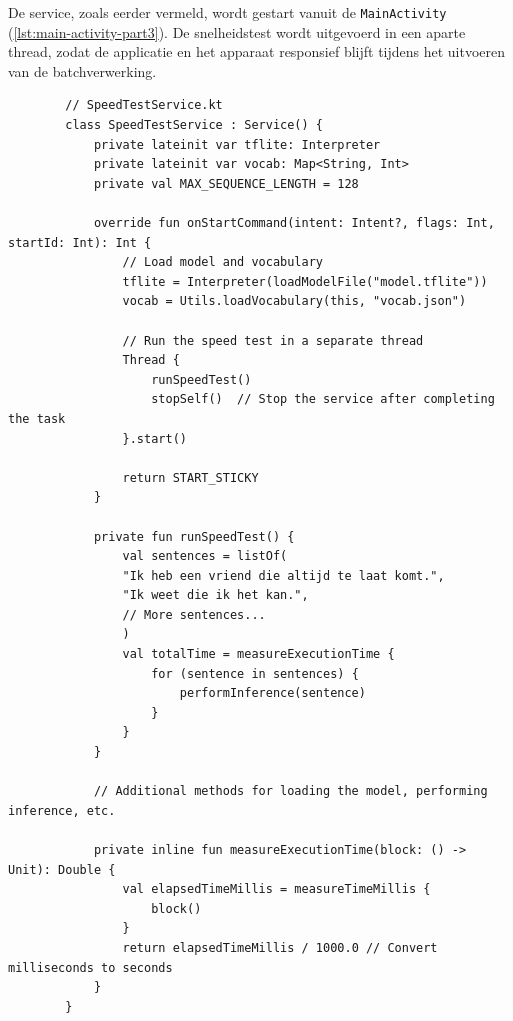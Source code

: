 De service, zoals eerder vermeld, wordt gestart vanuit de \texttt{MainActivity} (\ref{lst:main-activity-part3}). De snelheidstest wordt uitgevoerd in een aparte thread, zodat de applicatie en het apparaat responsief blijft tijdens het uitvoeren van de batchverwerking.

\begin{listing}
    \begin{verbatim}
        // SpeedTestService.kt
        class SpeedTestService : Service() {
            private lateinit var tflite: Interpreter
            private lateinit var vocab: Map<String, Int>
            private val MAX_SEQUENCE_LENGTH = 128
            
            override fun onStartCommand(intent: Intent?, flags: Int, startId: Int): Int {
                // Load model and vocabulary
                tflite = Interpreter(loadModelFile("model.tflite"))
                vocab = Utils.loadVocabulary(this, "vocab.json")
                
                // Run the speed test in a separate thread
                Thread {
                    runSpeedTest()
                    stopSelf()  // Stop the service after completing the task
                }.start()
                
                return START_STICKY
            }
            
            private fun runSpeedTest() {
                val sentences = listOf(
                "Ik heb een vriend die altijd te laat komt.",
                "Ik weet die ik het kan.",
                // More sentences...
                )
                val totalTime = measureExecutionTime {
                    for (sentence in sentences) {
                        performInference(sentence)
                    }
                }
            }
            
            // Additional methods for loading the model, performing inference, etc.
            
            private inline fun measureExecutionTime(block: () -> Unit): Double {
                val elapsedTimeMillis = measureTimeMillis {
                    block()
                }
                return elapsedTimeMillis / 1000.0 // Convert milliseconds to seconds
            }
        }
    \end{verbatim}
    \caption[\texttt{SpeedTestService.kt}]{De \texttt{SpeedTestService} voert snelheidstesten uit voor het -model, vergelijkbaar met de Python-scripts. De getoonde code is ingekort, maar functioneert op dezelfde manier als de activities in het project.}
    \label{lst:speed-test-service}
\end{listing}

